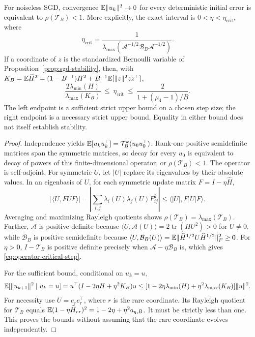 \begin{proposition}
 \label{prop:matrix-stability}
 For noiseless SGD, convergence $\mathbb{E}\|u_k\|^2 \to 0$ for every deterministic
 initial error is equivalent to $\rho(\mathcal T_B) < 1$. More explicitly, the
 exact interval is $0 < \eta < \eta_{\mathrm{crit}}$, where
 \begin{equation}
  \label{eq:operator-critical-step}
  \eta_{\mathrm{crit}} = \frac{1}{\lambda_{\max} (\mathcal A^{-1/2}\mathcal B_B\mathcal A^{-1/2})}.
 \end{equation}
 If a coordinate of $z$ is the standardized Bernoulli variable of
 Proposition~\ref{prop:sgd-stability}, then, with
 $K_B = \mathbb{E}\widehat H^2 = (1 - B^{-1})H^2 + B^{-1}\mathbb{E}[\|z\|^2zz^\top]$,
 \begin{equation}
  \label{eq:matrix-step-bounds}
  \frac{2\lambda_{\min}(H)}{\lambda_{\max}(K_B)} \ 
  \le \ \eta_{\mathrm{crit}} \ 
  \le \ \frac{2}{1 + (\mu_4 - 1)/B}.
 \end{equation}
 The left endpoint is a sufficient strict upper bound on a chosen step size; the
 right endpoint is a necessary strict upper bound. Equality in either bound does
 not itself establish stability.
\end{proposition}
\begin{proof}
 Independence yields $\mathbb{E}[u_k u_k^\top] = \mathcal T_B^k(u_0u_0^\top)$. Rank-one
 positive semidefinite matrices span the symmetric matrices, so decay for every
 $u_0$ is equivalent to decay of powers of this finite-dimensional operator, or
 $\rho(\mathcal T_B) < 1$. The operator is self-adjoint. For symmetric $U$, let
 $|U|$ replace its eigenvalues by their absolute values. In an eigenbasis of
 $U$, for each symmetric update matrix $F = I - \eta\widehat H$,
 \[
  |\langle U,FUF\rangle| = \left| \sum_{i,j}\lambda_i(U)\lambda_j(U)F_{ij}^2 \right|
                         \le \langle |U|,F|U|F\rangle.
 \]
 Averaging and maximizing Rayleigh quotients shows
 $\rho(\mathcal T_B) = \lambda_{\max}(\mathcal T_B)$. Further, $\mathcal A$ is
 positive definite because
 $\langle U,\mathcal A(U)\rangle = 2\operatorname{tr}(HU^2) > 0$ for $U \ne 0$,
 while $\mathcal B_B$ is positive semidefinite because
 $\langle U,\mathcal B_B(U)\rangle = \mathbb{E}\|\widehat H^{1/2}U\widehat H^{1/2}\|_F^2 \ge 0$.
 For $\eta > 0$, $I - \mathcal T_B$ is positive definite precisely when
 $\mathcal A - \eta\mathcal B_B$ is, which gives
 \eqref{eq:operator-critical-step}.

 For the sufficient bound, conditional on $u_k = u$,
 \[
  \mathbb{E}[\|u_{k+1}\|^2\mid u_k=u]
  = u^\top(I - 2\eta H + \eta^2K_B)u
  \le[1-2\eta\lambda_{\min}(H)+\eta^2\lambda_{\max}(K_B)] \|u\|^2.
 \]
 For necessity use $U = e_re_r^\top$, where $r$ is the rare coordinate. Its
 Rayleigh quotient for $\mathcal T_B$ equals
 $\mathbb{E}(1 - \eta\widehat H_{rr})^2 = 1 - 2\eta + \eta^2a_{q,B}$. It must be
 strictly less than one. This proves the bounds without assuming that the rare
 coordinate evolves independently.
\end{proof}

